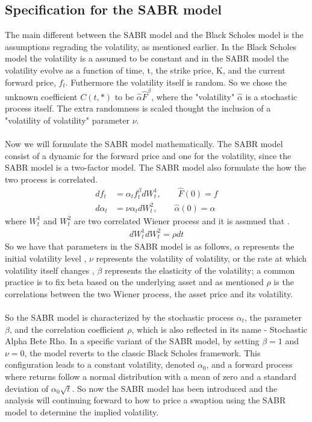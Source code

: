 \subsection{Specification for the SABR model}
The main different between the SABR model and the 
Black Scholes model is the assumptions regrading the 
volatility, as mentioned earlier. In the Black Scholes 
model the volatility is a assumed to be constant and 
in the SABR model the volatility evolve as a function
of time, t, the strike price, K, and the current
forward price, $f_t$. Futhermore the volatility itself
is random. So we chose the unknown coefficient $C(t,*)$
to be $\hat{\alpha} \hat{F}^{\beta}$, where the 
"volatility" $\hat{\alpha}$ is a stochastic process itself. 
The extra randomness is scaled thought the inclusion 
of a "volatility of volatility" parameter $\nu$.
\\\\
Now we will formulate the SABR model mathematically. 
The SABR model consist of a dynamic for the forward price
and one for the volatility, since the SABR model is a 
two-factor model. The SABR model also formulate the 
how the two process is correlated. 
\begin{align}
    df_t &= \alpha_t f_t^\beta dW_t^1, \quad \quad \hat{F}(0)=f   \label{f_dyn}\\
    d\alpha_t &= \nu \alpha_t dW_t^2, \quad \quad \hat{\alpha}(0)=\alpha \label{sigma_dyn}
\end{align}
where $W_t^{1}$ and $W_t^{2}$ are two correlated Wiener 
process and it is assmued that \cite{Smile}.
\begin{align}
    dW_t^{1}dW_t^{2}=\rho dt
\end{align}
So we have that 
parameters in the SABR model is as follows, $\alpha$ represents the initial volatility level
, $\nu$ represents the volatility of volatility, or the rate at which volatility itself changes
, $\beta$ represents the elasticity of the volatility; a common practice is to fix beta based on the underlying asset 
and as mentioned $\rho$ is the correlations between the 
two Wiener process, the asset price and its volatility. 
\\\\
So the SABR model is characterized by the stochastic process $\alpha_t$,
the parameter $\beta$, and the correlation coefficient $\rho$,
which is also reflected in its name - Stochastic Alpha Bete Rho.
In a specific variant of the SABR model, 
by setting $\beta = 1 $ and $\nu = 0$, the model reverts 
to the classic Black Scholes framework. 
This configuration leads to a constant volatility, 
denoted $\alpha_0 $, 
and a forward process where returns follow a 
normal distribution with a mean of zero and a standard 
deviation of $\alpha_0 \sqrt{t}$. So now the SABR model
has been introduced and the analysis will continuing forward 
to how to price a swaption using the SABR model to determine the implied
volatility.
